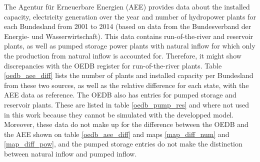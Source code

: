 The Agentur für Erneuerbare Energien (AEE) provides data about the installed capacity, electricity generation over the year and number of hydropower plants for each Bundesland \cite{aee} from 2001 to 2014 (based on data from the Bundesverband der Energie- und Wasserwirtschaft). This data contains run-of-the-river and reservoir plants, as well as pumped storage power plants with natural inflow for which only the production from natural inflow is accounted for. Therefore, it might show discrepancies with the OEDB register for run-of-the-river plants. Table \ref{oedb_aee_diff} lists the number of plants and installed capacity per Bundesland from these two sources, as well as the relative difference for each state, with the AEE data as reference. The OEDB also has entries for pumped storage and reservoir plants. These are listed in table \ref{oedb_pump_res} and where not used in this work because they cannot be simulated with the developped model. Moreover, these data do not make up for the difference between the OEDB and the AEE shown on table \ref{oedb_aee_diff} and maps \ref{map_diff_num} and \ref{map_diff_pow}, and the pumped storage entries do not make the distinction between natural inflow and pumped inflow.

